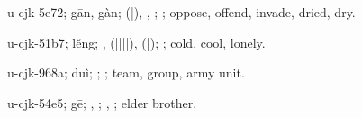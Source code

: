 \begin{multicols}{2}
{\cjkgGlue{}u-cjk-5e72; gān, gàn; \cjkgGlue{}\cjkgGlue{}(\cjkgGlue{}|\cjkgGlue{}), \cjkgGlue{}\cjkgGlue{}\cjkgGlue{}, \cjkgGlue{}\cjkgGlue{}\cjkgGlue{}; \cjkgGlue{}; oppose, offend, invade, dried, dry.

\cjkgGlue{}u-cjk-51b7; lěng; \cjkgGlue{}\cjkgGlue{}\cjkgGlue{}, \cjkgGlue{}\cjkgGlue{}(\cjkgGlue{}|\cjkgGlue{}|\cjkgGlue{}|\cjkgGlue{}|\cjkgGlue{}), \cjkgGlue{}\cjkgGlue{}(\cjkgGlue{}|\cjkgGlue{}); \cjkgGlue{}; cold, cool, lonely.

\cjkgGlue{}u-cjk-968a; duì; \cjkgGlue{}; \cjkgGlue{}; team, group, army unit.

\cjkgGlue{}u-cjk-54e5; gē; \cjkgGlue{}, \cjkgGlue{}; \cjkgGlue{}, \cjkgGlue{}; elder brother.

}
\end{multicols}

